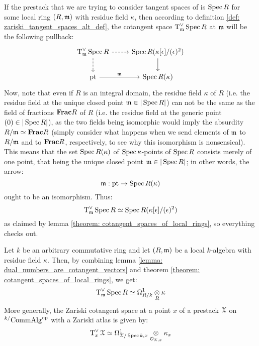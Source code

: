             \begin{remark}
                If the prestack that we are trying to consider tangent spaces of is $\operatorname{Spec} R$ for some local ring $(R, \mathfrak{m})$ with residue field $\kappa$, then according to definition \ref{def: zariski_tangent_spaces_alt_def}, the cotangent space $\operatorname{T}^{\vee}_{\mathfrak{m}}\operatorname{Spec} R$ at $\mathfrak{m}$ will be the following pullback:
                    $$
                        \begin{tikzcd}
                        	{\tangent^{\vee}_{\m}\Spec R} & {\Spec R(\kappa[\e]/(\e)^2)} \\
                        	\pt & {\Spec R(\kappa)}
                        	\arrow[from=1-2, to=2-2]
                        	\arrow["\m", from=2-1, to=2-2]
                        	\arrow[dashed, from=1-1, to=2-1]
                        	\arrow[dashed, from=1-1, to=1-2]
                        \end{tikzcd}
                    $$
                Now, note that even if $R$ is an integral domain, the residue field $\kappa$ of $R$ (i.e. the residue field at the unique closed point $\mathfrak{m} \in |\operatorname{Spec} R|$) can not be the same as the field of fractions $\mathbf{Frac} R$ of $R$ (i.e. the residue field at the generic point $(0) \in |\operatorname{Spec} R|$), as the two fields being isomorphic would imply the absurdity $R/\mathfrak{m} \simeq \mathbf{Frac} R$ (simply consider what happens when we send elements of $\mathfrak{m}$ to $R/\mathfrak{m}$ and to $\mathbf{Frac} R$, respectively, to see why this isomorphism is nonsensical). This means that the set $\operatorname{Spec} R(\kappa)$ of $\operatorname{Spec} \kappa$-points of $\operatorname{Spec} R$ consists merely of one point, that being the unique closed point $\mathfrak{m} \in |\operatorname{Spec} R|$; in other words, the arrow:
                    $$\mathfrak{m}: \mathrm{pt} \to \operatorname{Spec} R(\kappa)$$
                ought to be an isomorphism. Thus:
                    $$\operatorname{T}^{\vee}_{\mathfrak{m}}\operatorname{Spec} R \simeq \operatorname{Spec} R(\kappa[\epsilon]/(\epsilon)^2)$$
                as claimed by lemma \ref{theorem: cotangent_spaces_of_local_rings}, so everything checks out.
            \end{remark}
            \begin{remark} 
                Let $k$ be an arbitrary commutative ring and let $(R, \mathfrak{m})$ be a local $k$-algebra with residue field $\kappa$. Then, by combining lemma \ref{lemma: dual_numbers_are_cotangent_vectors} and theorem \ref{theorem: cotangent_spaces_of_local_rings}, we get:
                    $$\tangent^{\vee}_{\m}\Spec R \cong \Omega^1_{R/k} \tensor_R \kappa$$
                More generally, the Zariski cotangent space at a point $x$ of a prestack $\mathcal{X}$ on ${}^{k/}\mathrm{Comm}\mathrm{Alg}^{\mathrm{op}}$ with a Zariski atlas is given by:
                    $$\tangent^{\vee}_x\calX \cong \Omega^1_{\calX/\Spec k, x} \tensor_{\calO_{\calX, x}} \kappa_x$$
            \end{remark}
            
